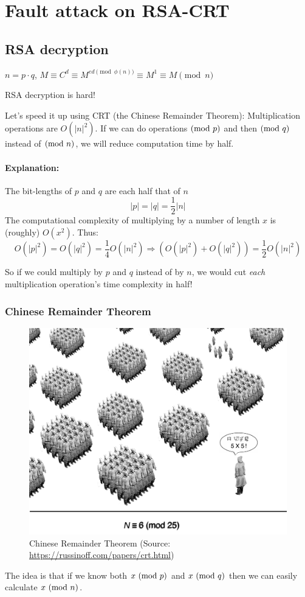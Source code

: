 \section{Fault attack on RSA-CRT}\label{sec:fault_attack_on_rsa_crt}

\subsection{RSA decryption}\label{subsec:rsa_decryption}
\(n = p\cdot q\), \(M \equiv C^d  \equiv M^{ed \pmod{\phi(n)}} \equiv M^1 \equiv M \pmod{n}\)

RSA decryption is hard!

Let's speed it up using CRT (the Chinese Remainder Theorem): Multiplication
operations are \(O(|n|^2)\). If we can do operations$\ (\mathrm{mod}\ p)$ and then$\ (\mathrm{mod}\ q)$ instead of$\ (\mathrm{mod}\ n)$, we will reduce computation time by half.

\paragraph{Explanation:}

The bit-lengths of \(p\) and \(q\) are each half that of \(n\)
\[|p|=|q|=\frac{1}{2}|n|\] The computational complexity of multiplying by a
number of length \(x\) is (roughly) \(O(x^2)\). Thus:
\[
O(|p|^2) = O(|q|^2) = \frac{1}{4}O(|n|^2) \Rightarrow (O(|p|^2) + O(|q|^2)) = \frac{1}{2}O(|n|^2)
\]

So if we could multiply by \(p\) and \(q\) instead of by \(n\), we would cut
\emph{each} multiplication operation's time complexity in half!

\subsubsection{Chinese Remainder Theorem}\label{subsubsec:chinese_remainder_theorem}
\begin{figure}[!ht]
	\centering
	\includegraphics[width=0.5\linewidth]{images/chapter_9/soldiers.jpeg}
	\caption{Chinese Remainder Theorem (Source: \url{https://russinoff.com/papers/crt.html})}\label{fig:chinese_remainder}
\end{figure}
The idea is that if we know both $x\ (\mathrm{mod}\ p)$ and $x\ (\mathrm{mod}\ q)$ then we can
easily calculate $x\ (\mathrm{mod}\ n)$.

